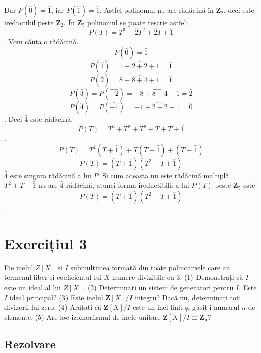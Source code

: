 \documentclass{article}
\begin{document}
\begin{enumerate}
      Dar $P(\widehat{0}) = \widehat{1}$, iar $P(\widehat{1}) = \widehat{1}$. Astfel polinomul nu are rădăcină în $\mathbf{Z}_2$, deci este ireductibil peste $\mathbf{Z}_2$.
       În $\mathbf{Z}_5$ polinomul se poate rescrie astfel: 
      \[ P(T) = T^3 + \widehat{2}T^2 + \widehat{2}T + \widehat{1}\].
      Vom căuta o rădăcină. 
      \[ P(\widehat{0}) = \widehat{1}\]
      \[ P(\widehat{1}) = \widehat{1 + 2 + 2 + 1} = \widehat{1}\]
      \[ P(\widehat{2}) = \widehat{8 + 8 + 4 + 1} = \widehat{1}\]
      \[ P(\widehat{3}) = P(\widehat{-2}) = \widehat{-8 + 8 - 4 + 1} = \widehat{2}\]
      \[ P(\widehat{4}) = P(\widehat{-1}) = \widehat{-1 + 2 - 2 + 1} = \widehat{0}\].
      Deci $\widehat{4}$ este rădăcină.
      \[ P(T) = T^3 + T^2 + T^2 + T + T + \widehat{1}\].
      \[ P(T) = T^2 (T + \widehat{1}) + T(T + \widehat{1}) + (T + \widehat{1})\]
      \[ P(T) = (T + \widehat{1})(T^2 + T + \widehat{1})\]
      $\widehat{4}$ este singura rădăcină a lui $P$. Și cum aceasta nu este rădăcină multiplă $T^2 + T + \widehat{1}$ nu are $\widehat{4}$ rădăcină, atunci forma ireductibilă a lui $P(T)$ peste $\mathbf{Z}_5$ este 
      \[ P(T) = (T + \widehat{1})(T^2 + T + \widehat{1})\]. 
\end{enumerate}



\section{Exercițiul 3}
Fie inelul $Z[X]$ și $I$ submulțimea formată din toate polinoamele care au termenul liber și coeficientul lui $X$ numere divizibile cu 3.
\newline
(1) Demonstrați că $I$ este un ideal al lui $Z[X]$.
\newline
(2) Determinați un sistem de generatori pentru $I$. Este $I$ ideal principal?
\newline
(3) Este inelul $\mathbf{Z}[X]/I$ integru? Dacă nu, determinați toți divizorii lui zero.
\newline
(4) Arătați că $\mathbf{Z}[X]/I$ este un inel finit și găsiț-i numărul $n$ de elemente.
\newline
(5) Are loc izomorfismul de inele unitare $\mathbf{Z}[X]/I \cong \mathbf{Z_n}$?
\subsection{Rezolvare}
\end{document}
